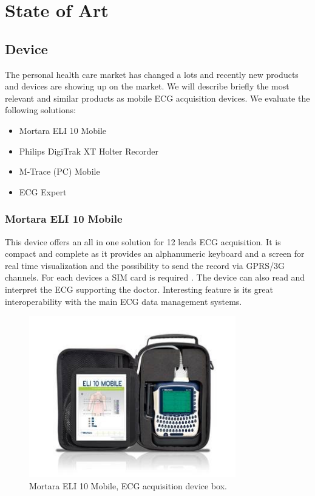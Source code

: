 
\chapter{State of Art}
\label{Chapter3} 

\section{Device}
The personal health care market has changed a lots and recently new products and devices are showing up on the market. We will describe briefly the most relevant and similar products as mobile ECG acquisition devices.  We evaluate the following solutions:
\begin{itemize}
	\item Mortara ELI 10 Mobile
	\item Philips DigiTrak XT Holter Recorder
	\item M-Trace (PC) Mobile
	\item ECG Expert 
\end{itemize}

\subsection{Mortara ELI 10 Mobile}
This device offers an all in one solution for 12 leads ECG acquisition. It is compact and complete as it provides an alphanumeric keyboard and a screen for real time visualization and the possibility to send the record via GPRS/3G channels. For each devices a SIM card is required . The device can also read and interpret the ECG supporting the doctor. Interesting feature is its great interoperability with the main ECG data management systems.
\begin{figure}[ht!]
	\centering
	\includegraphics[width=90mm]{figures/ch3/1.png}
	\caption{Mortara ELI 10 Mobile, ECG acquisition device box.}
	\label{fig3.1}
\end{figure}


